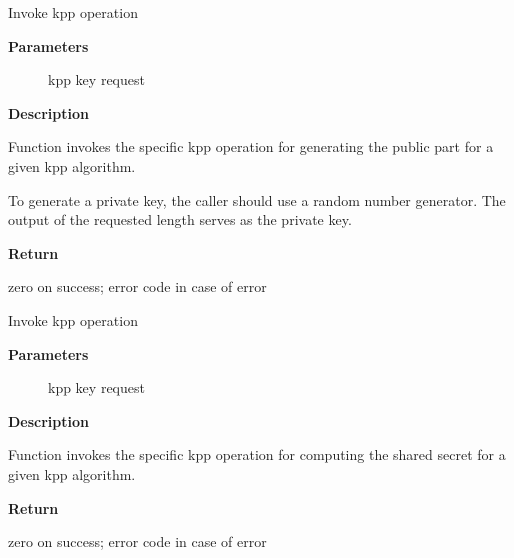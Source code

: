 \documentclass[a4paper,8pt,english]{sphinxmanual}
\begin{document}
\begin{fulllineitems}
\label{crypto/api-kpp:c.crypto_kpp_generate_public_key}
Invoke kpp operation

\end{fulllineitems}


\textbf{Parameters}
\begin{description}
\item[{}] \leavevmode
kpp key request

\end{description}

\textbf{Description}

Function invokes the specific kpp operation for generating the public part
for a given kpp algorithm.

To generate a private key, the caller should use a random number generator.
The output of the requested length serves as the private key.

\textbf{Return}

zero on success; error code in case of error

\begin{fulllineitems}
\label{crypto/api-kpp:c.crypto_kpp_compute_shared_secret}
Invoke kpp operation

\end{fulllineitems}


\textbf{Parameters}
\begin{description}
\item[{}] \leavevmode
kpp key request

\end{description}

\textbf{Description}

Function invokes the specific kpp operation for computing the shared secret
for a given kpp algorithm.

\textbf{Return}

zero on success; error code in case of error
\end{document}
